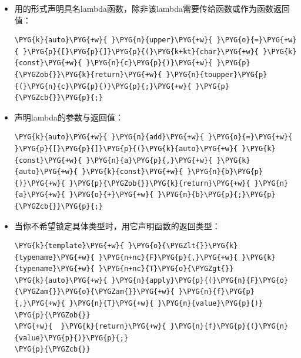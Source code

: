 \begin{itemize}

\item 用的形式声明具名lambda函数，除非该lambda需要传给函数或作为函数返回值：



\begin{codeblockbg}
\begin{Verbatim}[commandchars=\\\{\},breaklines=true,breakanywhere=true,fontsize=\codefont,xleftmargin=17bp]
\PYG{k}{auto}\PYG{+w}{ }\PYG{n}{upper}\PYG{+w}{ }\PYG{o}{=}\PYG{+w}{ }\PYG{p}{[}\PYG{p}{]}\PYG{p}{(}\PYG{k+kt}{char}\PYG{+w}{ }\PYG{k}{const}\PYG{+w}{ }\PYG{n}{c}\PYG{p}{)}\PYG{+w}{ }\PYG{p}{\PYGZob{}}\PYG{k}{return}\PYG{+w}{ }\PYG{n}{toupper}\PYG{p}{(}\PYG{n}{c}\PYG{p}{)}\PYG{p}{;}\PYG{+w}{ }\PYG{p}{\PYGZcb{}}\PYG{p}{;}
\end{Verbatim}
\end{codeblockbg}



\item 声明lambda的参数与返回值：



\begin{codeblockbg}
\begin{Verbatim}[commandchars=\\\{\},breaklines=true,breakanywhere=true,fontsize=\codefont,xleftmargin=17bp]
\PYG{k}{auto}\PYG{+w}{ }\PYG{n}{add}\PYG{+w}{ }\PYG{o}{=}\PYG{+w}{ }\PYG{p}{[}\PYG{p}{]}\PYG{p}{(}\PYG{k}{auto}\PYG{+w}{ }\PYG{k}{const}\PYG{+w}{ }\PYG{n}{a}\PYG{p}{,}\PYG{+w}{ }\PYG{k}{auto}\PYG{+w}{ }\PYG{k}{const}\PYG{+w}{ }\PYG{n}{b}\PYG{p}{)}\PYG{+w}{ }\PYG{p}{\PYGZob{}}\PYG{k}{return}\PYG{+w}{ }\PYG{n}{a}\PYG{+w}{ }\PYG{o}{+}\PYG{+w}{ }\PYG{n}{b}\PYG{p}{;}\PYG{p}{\PYGZcb{}}\PYG{p}{;}
\end{Verbatim}
\end{codeblockbg}



\item 当你不希望锁定具体类型时，用它声明函数的返回类型：



\begin{codeblockbg}
\begin{Verbatim}[commandchars=\\\{\},breaklines=true,breakanywhere=true,fontsize=\codefont,xleftmargin=17bp]
\PYG{k}{template}\PYG{+w}{ }\PYG{o}{\PYGZlt{}}\PYG{k}{typename}\PYG{+w}{ }\PYG{n+nc}{F}\PYG{p}{,}\PYG{+w}{ }\PYG{k}{typename}\PYG{+w}{ }\PYG{n+nc}{T}\PYG{o}{\PYGZgt{}}
\PYG{k}{auto}\PYG{+w}{ }\PYG{n}{apply}\PYG{p}{(}\PYG{n}{F}\PYG{o}{\PYGZam{}}\PYG{o}{\PYGZam{}}\PYG{+w}{ }\PYG{n}{f}\PYG{p}{,}\PYG{+w}{ }\PYG{n}{T}\PYG{+w}{ }\PYG{n}{value}\PYG{p}{)}
\PYG{p}{\PYGZob{}}
\PYG{+w}{  }\PYG{k}{return}\PYG{+w}{ }\PYG{n}{f}\PYG{p}{(}\PYG{n}{value}\PYG{p}{)}\PYG{p}{;}
\PYG{p}{\PYGZcb{}}
\end{Verbatim}
\end{codeblockbg}

\end{itemize}


